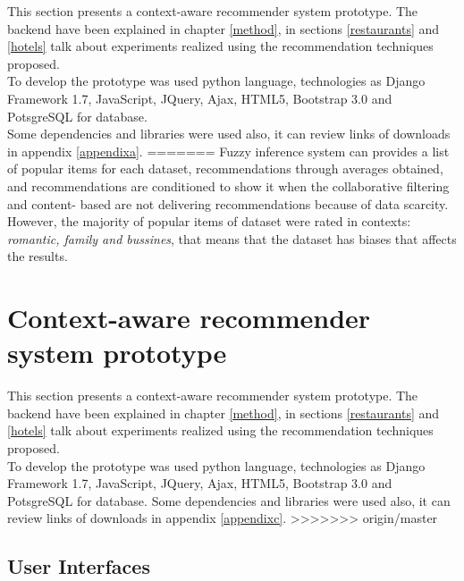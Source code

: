 This section presents a context-aware recommender system prototype.
The backend have been explained in chapter  \ref{method},  in sections
 \ref{restaurants} and  \ref{hotels} talk about experiments realized
using the recommendation techniques proposed. \\ To develop the prototype
was used python language, technologies as Django Framework 1.7,
JavaScript, JQuery, Ajax, HTML5, Bootstrap 3.0  and PotsgreSQL for database.\\ 
Some dependencies and libraries were used also, it can review links of
downloads in appendix  \ref{appendixa}.
=======
Fuzzy inference system can provides a list of popular items for each dataset,
recommendations through averages obtained, and recommendations are
conditioned to show it when the collaborative filtering and content-
based are not delivering recommendations because of data scarcity.\\ 
However, the majority of popular items of dataset were rated in contexts: 
\textit{romantic, family and bussines}, that means that the dataset has
biases that affects the results.


\section{Context-aware recommender system prototype} 
This section presents a context-aware recommender system prototype.
The backend have been explained in chapter \ref{method},  in sections
\ref{restaurants} and \ref{hotels} talk about experiments realized
using the recommendation techniques proposed. \\ To develop the prototype
was used python language, technologies as Django Framework 1.7,
JavaScript, JQuery, Ajax, HTML5, Bootstrap 3.0  and PotsgreSQL for database.
Some dependencies and libraries were used also, it can review links of
downloads in appendix \ref{appendixc}.
>>>>>>> origin/master

\subsection{User Interfaces}

